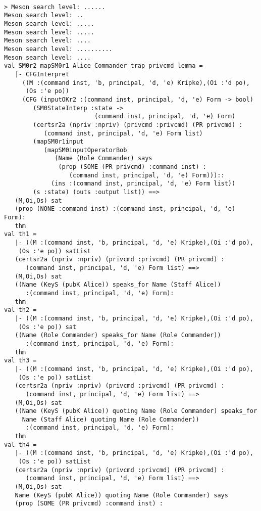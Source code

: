 \documentclass{report}
\begin{document}
\begin{session}
  \begin{scriptsize}
\begin{verbatim}

> Meson search level: ......
Meson search level: ..
Meson search level: .....
Meson search level: .....
Meson search level: ....
Meson search level: ..........
Meson search level: ....
val SM0r2_mapSM0r1_Alice_Commander_trap_privcmd_lemma =
   |- CFGInterpret
     ((M :(command inst, 'b, principal, 'd, 'e) Kripke),(Oi :'d po),
      (Os :'e po))
     (CFG (inputOKr2 :(command inst, principal, 'd, 'e) Form -> bool)
        (SM0StateInterp :state ->
                         (command inst, principal, 'd, 'e) Form)
        (certsr2a (npriv :npriv) (privcmd :privcmd) (PR privcmd) :
           (command inst, principal, 'd, 'e) Form list)
        (mapSM0r1input
           (mapSM0inputOperatorBob
              (Name (Role Commander) says
               (prop (SOME (PR privcmd) :command inst) :
                  (command inst, principal, 'd, 'e) Form)))::
             (ins :(command inst, principal, 'd, 'e) Form list))
        (s :state) (outs :output list)) ==>
   (M,Oi,Os) sat
   (prop (NONE :command inst) :(command inst, principal, 'd, 'e) Form):
   thm
val th1 =
   |- ((M :(command inst, 'b, principal, 'd, 'e) Kripke),(Oi :'d po),
    (Os :'e po)) satList
   (certsr2a (npriv :npriv) (privcmd :privcmd) (PR privcmd) :
      (command inst, principal, 'd, 'e) Form list) ==>
   (M,Oi,Os) sat
   ((Name (KeyS (pubK Alice)) speaks_for Name (Staff Alice))
      :(command inst, principal, 'd, 'e) Form):
   thm
val th2 =
   |- ((M :(command inst, 'b, principal, 'd, 'e) Kripke),(Oi :'d po),
    (Os :'e po)) sat
   ((Name (Role Commander) speaks_for Name (Role Commander))
      :(command inst, principal, 'd, 'e) Form):
   thm
val th3 =
   |- ((M :(command inst, 'b, principal, 'd, 'e) Kripke),(Oi :'d po),
    (Os :'e po)) satList
   (certsr2a (npriv :npriv) (privcmd :privcmd) (PR privcmd) :
      (command inst, principal, 'd, 'e) Form list) ==>
   (M,Oi,Os) sat
   ((Name (KeyS (pubK Alice)) quoting Name (Role Commander) speaks_for
     Name (Staff Alice) quoting Name (Role Commander))
      :(command inst, principal, 'd, 'e) Form):
   thm
val th4 =
   |- ((M :(command inst, 'b, principal, 'd, 'e) Kripke),(Oi :'d po),
    (Os :'e po)) satList
   (certsr2a (npriv :npriv) (privcmd :privcmd) (PR privcmd) :
      (command inst, principal, 'd, 'e) Form list) ==>
   (M,Oi,Os) sat
   Name (KeyS (pubK Alice)) quoting Name (Role Commander) says
   (prop (SOME (PR privcmd) :command inst) :

\end{verbatim}
\end{scriptsize}
\end{session}
\end{document}
